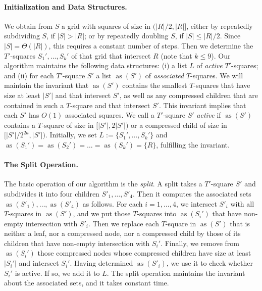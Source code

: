 \documentclass[11pt]{paper}
\newcommand {\eqdef} {:=}
\DeclareMathOperator {\as}{as}
\begin{document}
   \paragraph{Initialization and Data Structures.}
      We obtain from  $S$ a grid with squares of size in
       $(|R|/2, |R|]$, either by repeatedly subdividing 
      $S$, if $|S| > |R|$; or by repeatedly doubling $S$,
      if $|S| \leq |R|/2$. Since $|S| = \Theta(|R|)$, this requires a constant
      number of steps. Then we determine
      the $T'$-squares $S_1', \dots, S_k'$ of that grid that intersect $R$ 
      (note that $k \leq 9$). Our algorithm maintains the 
      following data structures:
      (i) a list $L$ of \emph{active} $T'$-squares; and (ii) for each 
      $T'$-square $S'$ a list $\as(S')$ of \emph{associated} $T$-squares. 
      We will maintain the invariant that $\as(S')$ contains the smallest 
      $T$-squares that have size at least $|S'|$  and that intersect $S'$, as
      well as any compressed children that are contained in such a
      $T$-square and that intersect $S'$. This invariant implies
      that each $S'$ has $O(1)$ associated squares. We call
      a $T'$-square $S'$ \emph{active} if 
      $\as(S')$ contains a $T$-square
      of size in $[|S'|, 2|S'|)$ or a compressed child of size in 
      $[|S'|/2^{2a}, |S'|)$. 
      Initially, we set $L \eqdef \{S_1', \dots, S_k'\}$ 
      and $\as(S_1') = \as(S_2') = \dots = \as(S_k') = \{R\}$,
      fulfilling the invariant.
  
    \paragraph{The Split Operation.}
      The basic operation of our algorithm is the \emph{split}.
      A split takes a $T'$-square $S'$ and subdivides it into
      four children $S'_1, \dots, S'_4$. Then it computes
      the associated sets $\as(S'_1), \dots, \as(S'_4)$ as follows.
      For each $i=1,\dots,4$, we intersect 
      $S'_i$ with all $T$-squares in $\as(S')$, and we put those $T$-squares 
      into $\as(S_i')$ that have non-empty intersection with $S'_i$.
      Then we replace each $T$-square in $\as(S')$ that is neither a 
      leaf, nor a compressed node, nor a compressed child by those of its
      children that have non-empty intersection with $S_i'$. Finally, we remove
      from $\as(S_i')$ those compressed nodes whose compressed children have
      size at least $|S_i'|$ and intersect $S_i'$. Having determined
      $\as(S'_i)$, we use it to check whether $S_i'$ is active. If so, we add 
      it to $L$. The split operation maintains the invariant
      about the associated sets, and it takes constant time.
      
\end{document}
